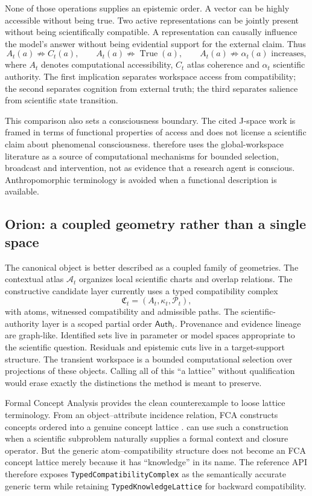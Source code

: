 None of those operations supplies an epistemic order. A vector can be highly accessible without being true. Two active representations can be jointly present without being scientifically compatible. A representation can causally influence the model's answer without being evidential support for the external claim. Thus
\[
A_t(a)\not\Rightarrow C_t(a),\qquad
A_t(a)\not\Rightarrow \operatorname{True}(a),\qquad
A_t(a)\not\Rightarrow \alpha_t(a)\text{ increases},
\]
where \(A_t\) denotes computational accessibility, \(C_t\) atlas coherence and \(\alpha_t\) scientific authority. The first implication separates workspace access from compatibility; the second separates cognition from external truth; the third separates salience from scientific state transition.

This comparison also sets a consciousness boundary. The cited J-space work is framed in terms of functional properties of access and does not license a scientific claim about phenomenal consciousness. \RAKL{} therefore uses the global-workspace literature as a source of computational mechanisms for bounded selection, broadcast and intervention, not as evidence that a research agent is conscious. Anthropomorphic terminology is avoided when a functional description is available.

\subsection{Orion: a coupled geometry rather than a single space}

The canonical \RAKL{} object is better described as a coupled family of geometries. The contextual atlas \(\mathcal A_t\) organizes local scientific charts and overlap relations. The constructive candidate layer currently uses a typed compatibility complex
\[
\mathfrak C_t=(A_t,\kappa_t,\mathcal P_t),
\]
with atoms, witnessed compatibility and admissible paths. The scientific-authority layer is a scoped partial order \(\mathsf{Auth}_t\). Provenance and evidence lineage are graph-like. Identified sets live in parameter or model spaces appropriate to the scientific question. Residuals and epistemic cuts live in a target-support structure. The transient workspace is a bounded computational selection over projections of these objects. Calling all of this ``a lattice'' without qualification would erase exactly the distinctions the method is meant to preserve.

Formal Concept Analysis provides the clean counterexample to loose lattice terminology. From an object--attribute incidence relation, FCA constructs concepts ordered into a genuine concept lattice \cite{ganterwille2024}. \RAKL{} can use such a construction when a scientific subproblem naturally supplies a formal context and closure operator. But the generic atom--compatibility structure does not become an FCA concept lattice merely because it has ``knowledge'' in its name. The reference API therefore exposes \texttt{TypedCompatibilityComplex} as the semantically accurate generic term while retaining \texttt{TypedKnowledgeLattice} for backward compatibility.

